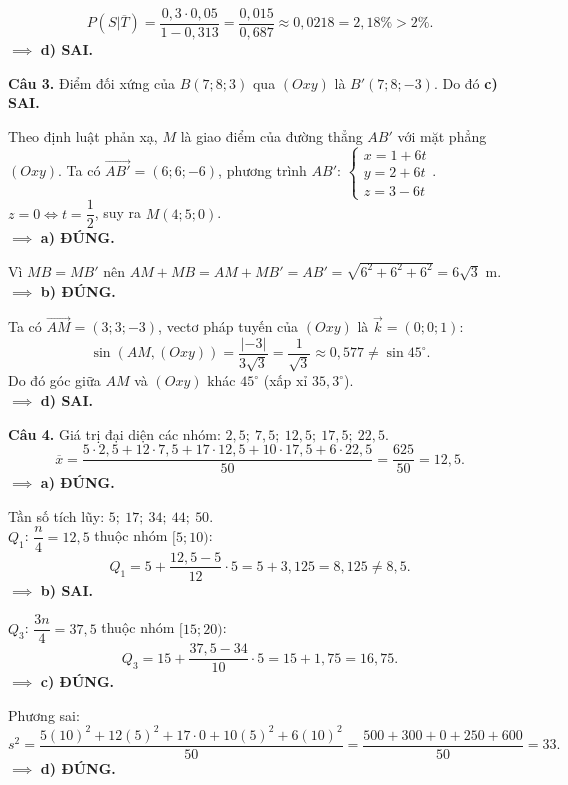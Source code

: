 \documentclass[12pt,a4paper]{article}
\begin{document}
\[
P(S|\overline{T}) = \dfrac{0{,}3\cdot 0{,}05}{1 - 0{,}313} = \dfrac{0{,}015}{0{,}687} \approx 0{,}0218 = 2{,}18\% > 2\%.
\]
$\implies$ \textbf{d) SAI.}

\vspace{0.3cm}
\noindent\textbf{Câu 3.} Điểm đối xứng của $B(7; 8; 3)$ qua $(Oxy)$ là $B'(7; 8; -3)$. Do đó \textbf{c) SAI.}

Theo định luật phản xạ, $M$ là giao điểm của đường thẳng $AB'$ với mặt phẳng $(Oxy)$. Ta có $\overrightarrow{AB'} = (6; 6; -6)$, phương trình $AB'$: $\begin{cases} x = 1 + 6t \\ y = 2 + 6t \\ z = 3 - 6t \end{cases}$.\\
$z = 0 \iff t = \dfrac{1}{2}$, suy ra $M(4; 5; 0)$.\\
$\implies$ \textbf{a) ĐÚNG.}

Vì $MB = MB'$ nên $AM + MB = AM + MB' = AB' = \sqrt{6^2 + 6^2 + 6^2} = 6\sqrt{3}\text{ m}$.\\
$\implies$ \textbf{b) ĐÚNG.}

Ta có $\overrightarrow{AM} = (3; 3; -3)$, vectơ pháp tuyến của $(Oxy)$ là $\vec{k} = (0; 0; 1)$:
\[
\sin(AM, (Oxy)) = \dfrac{|-3|}{3\sqrt{3}} = \dfrac{1}{\sqrt{3}} \approx 0{,}577 \ne \sin 45^\circ.
\]
Do đó góc giữa $AM$ và $(Oxy)$ khác $45^\circ$ (xấp xỉ $35{,}3^\circ$).\\
$\implies$ \textbf{d) SAI.}

\vspace{0.3cm}
\noindent\textbf{Câu 4.} Giá trị đại diện các nhóm: $2{,}5;\ 7{,}5;\ 12{,}5;\ 17{,}5;\ 22{,}5$.
\[
\overline{x} = \dfrac{5\cdot 2{,}5 + 12\cdot 7{,}5 + 17\cdot 12{,}5 + 10\cdot 17{,}5 + 6\cdot 22{,}5}{50} = \dfrac{625}{50} = 12{,}5.
\]
$\implies$ \textbf{a) ĐÚNG.}

Tần số tích lũy: $5;\ 17;\ 34;\ 44;\ 50$.\\
$Q_1$: $\dfrac{n}{4} = 12{,}5$ thuộc nhóm $[5; 10)$:
\[
Q_1 = 5 + \dfrac{12{,}5 - 5}{12}\cdot 5 = 5 + 3{,}125 = 8{,}125 \ne 8{,}5.
\]
$\implies$ \textbf{b) SAI.}

$Q_3$: $\dfrac{3n}{4} = 37{,}5$ thuộc nhóm $[15; 20)$:
\[
Q_3 = 15 + \dfrac{37{,}5 - 34}{10}\cdot 5 = 15 + 1{,}75 = 16{,}75.
\]
$\implies$ \textbf{c) ĐÚNG.}

Phương sai:
\[
s^2 = \dfrac{5(10)^2 + 12(5)^2 + 17\cdot 0 + 10(5)^2 + 6(10)^2}{50} = \dfrac{500 + 300 + 0 + 250 + 600}{50} = 33.
\]
$\implies$ \textbf{d) ĐÚNG.}
\end{document}
